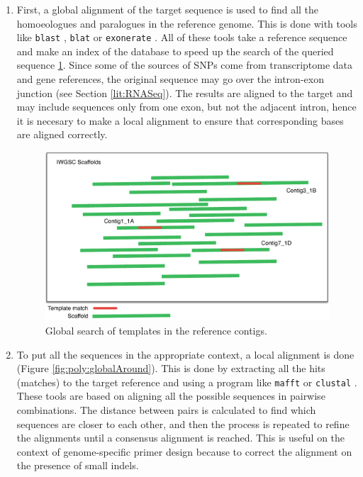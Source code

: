 \begin{enumerate}
\item First, a global alignment of the target sequence is used to find all the homoeologues and paralogues in the reference genome.
This is done with tools like \verb|blast| \citep{Altschul1990}, \verb|blat| \citep{Kent2002} or \verb|exonerate| \citep{Slater2005}.
All of these tools take a reference sequence and make an index of the database to speed up the search of the queried sequence  \ref{fig:poly:globalSearch}. 
Since some of the sources of SNPs come from transcriptome data and gene references, the original sequence may go over the intron-exon junction (see Section \ref{lit:RNASeq}).  
The results are aligned to the target and may include sequences only from one exon, but not the adjacent intron, hence it is necesary to make a local alignment to ensure that corresponding bases are aligned correctly. 

\begin{figure}
\centering
\includegraphics[width=1\textwidth]{PolyMarker/Figures/aln/scaffoldsSearch.pdf}
\caption{Global search of templates in the reference contigs.}
\label{fig:poly:globalSearch}
\end{figure}

\item To put all the sequences in the appropriate context, a local alignment is done (Figure \ref{fig:poly:globalAround}). 
This is done by extracting all the hits (matches) to the target reference and using a program like \verb|mafft| \citep{Katoh2013} or \verb|clustal| \citep{Higgins1988}. 
These tools are based on aligning all the possible sequences in pairwise combinations.
The distance between pairs is calculated to find which sequences are closer to each other, and then the process is repeated to refine the alignments until a consensus alignment is reached. 
This is useful on the context of genome-specific primer design because to correct the alignment on the presence of small \gls{indels}.  


\end{enumerate}
